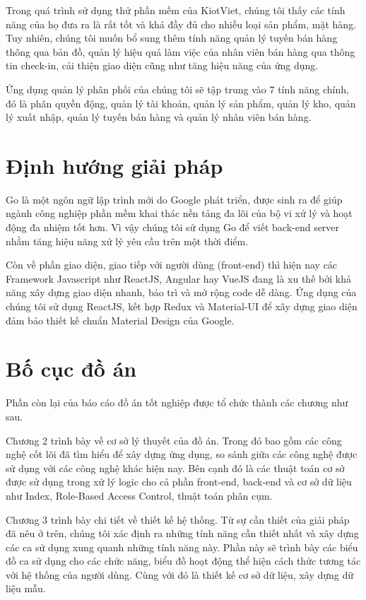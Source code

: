 Trong quá trình sử dụng thử phần mềm của KiotViet,
chúng tôi thấy các tính năng của
họ đưa ra là rất tốt và khá đầy đủ cho nhiều loại sản phẩm, mặt hàng.
Tuy nhiên, chúng tôi muốn bổ sung thêm tính năng quản lý tuyến bán hàng
thông qua bản đồ, quản lý hiệu quả làm việc của nhân viên
bán hàng qua thông tin check-in, cải thiện giao diện cũng
như tăng hiệu năng của ứng dụng. 

Ứng dụng quản lý phân phối của chúng tôi sẽ tập trung vào 7 tính năng chính,
đó là phân quyền động, quản lý tài khoản, quản lý sản phẩm, quản lý kho,
quản lý xuất nhập, quản lý tuyến bán hàng và quản lý nhân viên bán hàng.

\section{Định hướng giải pháp}
Go là một ngôn ngữ lập trình mới do Google phát triển,
được sinh ra để giúp ngành công nghiệp phần mềm khai thác nền
tảng đa lõi của bộ vi xử lý và hoạt động đa nhiệm tốt hơn.
Vì vậy chúng tôi sử dụng Go để viết back-end server nhằm tăng hiệu
năng xử lý yêu cầu trên một thời điểm.

Còn về phần giao diện, giao tiếp với người dùng (front-end) thì hiện
nay các Framework Javascript như ReactJS, Angular hay VueJS đang
là xu thế bởi khả năng xây dựng giao diện nhanh, bảo trì và
mở rộng code dễ dàng. Ứng dụng của chúng tôi sử dụng ReactJS, kết hợp Redux và
Material-UI để xây dựng giao diện đảm bảo thiết kế
chuẩn Material Design của Google. 

\section{Bố cục đồ án}
Phần còn lại của báo cáo đồ án tốt nghiệp được tổ
chức thành các chương như sau.

Chương 2 trình bày về cơ sở lý thuyết của đồ án. Trong đó bao gồm
các công nghệ cốt lõi đã tìm hiểu để xây dựng ứng dụng, so sánh
giữa các công nghệ được sử dụng với các công nghệ khác hiện nay.
Bên cạnh đó là các thuật toán cơ sở được sử dụng trong xử lý logic
cho cả phần front-end, back-end và cơ sở dữ liệu như Index,
Role-Based Access Control, thuật toán phân cụm. 

Chương 3 trình bày chi tiết về thiết kế hệ thống. Từ sự cần thiết
của giải pháp đã nêu ở trên, chúng tôi xác định ra những tính năng cần thiết
nhất và xây dựng các ca sử dụng xung quanh những tính năng này.
Phần này sẽ trình bày các biểu đồ ca sử dụng cho các chức năng,
biểu đồ hoạt động thể hiện cách thức tương tác với hệ thống của
người dùng. Cùng với đó là thiết kế cơ sở dữ liệu, xây dựng dữ liệu mẫu.

